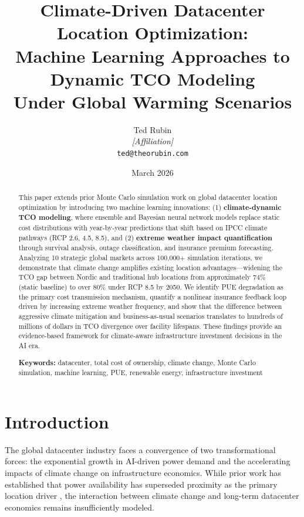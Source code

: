 \documentclass[12pt,a4paper]{article}
\title{Climate-Driven Datacenter Location Optimization: \\
Machine Learning Approaches to Dynamic TCO Modeling \\
Under Global Warming Scenarios}
\author{Ted Rubin \\
\textit{[Affiliation]} \\
\texttt{ted@theorubin.com}}
\date{March 2026}
\begin{document}
\maketitle

\begin{abstract}
This paper extends prior Monte Carlo simulation work on global datacenter location optimization by introducing two machine learning innovations: (1) \textbf{climate-dynamic TCO modeling}, where ensemble and Bayesian neural network models replace static cost distributions with year-by-year predictions that shift based on IPCC climate pathways (RCP 2.6, 4.5, 8.5), and (2) \textbf{extreme weather impact quantification} through survival analysis, outage classification, and insurance premium forecasting. Analyzing 10 strategic global markets across 100,000+ simulation iterations, we demonstrate that climate change amplifies existing location advantages—widening the TCO gap between Nordic and traditional hub locations from approximately 74\% (static baseline) to over 80\% under RCP 8.5 by 2050. We identify PUE degradation as the primary cost transmission mechanism, quantify a nonlinear insurance feedback loop driven by increasing extreme weather frequency, and show that the difference between aggressive climate mitigation and business-as-usual scenarios translates to hundreds of millions of dollars in TCO divergence over facility lifespans. These findings provide an evidence-based framework for climate-aware infrastructure investment decisions in the AI era.

\medskip
\noindent\textbf{Keywords:} datacenter, total cost of ownership, climate change, Monte Carlo simulation, machine learning, PUE, renewable energy, infrastructure investment
\end{abstract}

\section{Introduction}
\label{sec:intro}

The global datacenter industry faces a convergence of two transformational forces: the exponential growth in AI-driven power demand and the accelerating impacts of climate change on infrastructure economics. While prior work has established that power availability has superseded proximity as the primary location driver \citep{dccore2025}, the interaction between climate change and long-term datacenter economics remains insufficiently modeled.
\end{document}
